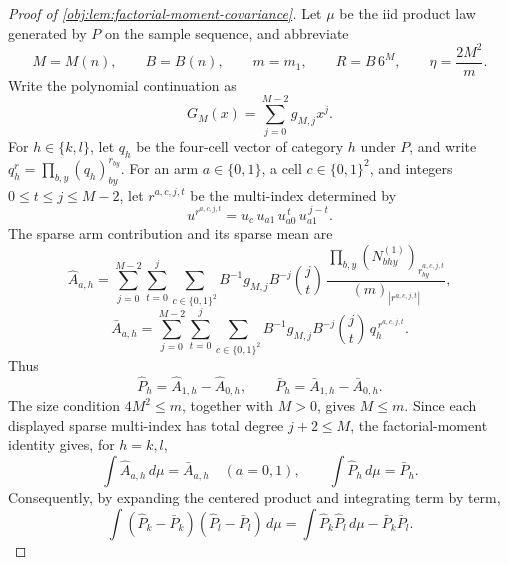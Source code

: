 \documentclass[11pt]{article}
\begin{document}
\begin{proof}[Proof of \cref{obj:lem:factorial-moment-covariance}]
Let \(\mu\) be the iid product law generated by \(P\) on the sample sequence, and abbreviate
\[
M=M(n),\qquad B=B(n),\qquad m=m_1,\qquad
R=B\,6^M,\qquad \eta=\frac{2M^2}{m}.
\]
Write the polynomial continuation as
\[
G_M(x)=\sum_{j=0}^{M-2}g_{M,j}x^j.
\]
For \(h\in\{k,l\}\), let \(q_h\) be the four-cell vector of category \(h\) under
\(P\), and write \(q_h^r=\prod_{b,y}(q_h)_{by}^{r_{by}}\).  For an arm
\(a\in\{0,1\}\), a cell \(c\in\{0,1\}^2\), and integers
\(0\le t\le j\le M-2\), let \(r^{a,c,j,t}\) be the multi-index determined by
\[
u^{r^{a,c,j,t}}
=u_c\,u_{a1}\,u_{a0}^{\,t}\,u_{a1}^{\,j-t}.
\]
The sparse arm contribution and its sparse mean are
\[
\widehat A_{a,h}
=
\sum_{j=0}^{M-2}\sum_{t=0}^{j}\sum_{c\in\{0,1\}^2}
B^{-1}g_{M,j}B^{-j}\binom jt\,
\frac{\prod_{b,y}(N^{(1)}_{bhy})_{r^{a,c,j,t}_{by}}}{(m)_{|r^{a,c,j,t}|}},
\]
\[
\bar A_{a,h}
=
\sum_{j=0}^{M-2}\sum_{t=0}^{j}\sum_{c\in\{0,1\}^2}
B^{-1}g_{M,j}B^{-j}\binom jt\,q_h^{\,r^{a,c,j,t}}.
\]
Thus
\[
\widehat P_h=\widehat A_{1,h}-\widehat A_{0,h},
\qquad
\bar P_h=\bar A_{1,h}-\bar A_{0,h}.
\]
The size condition \(4M^2\le m\), together with \(M>0\), gives \(M\le m\).  Since
each displayed sparse multi-index has total degree \(j+2\le M\), the factorial-moment
identity gives, for \(h=k,l\),
\[
\int \widehat A_{a,h}\,d\mu=\bar A_{a,h}\quad(a=0,1),
\qquad
\int \widehat P_h\,d\mu=\bar P_h .
\]
Consequently, by expanding the centered product and integrating term by term,
\[
\int(\widehat P_k-\bar P_k)(\widehat P_l-\bar P_l)\,d\mu
=
\int \widehat P_k\widehat P_l\,d\mu-\bar P_k\bar P_l .
\]


\end{proof}
\end{document}
